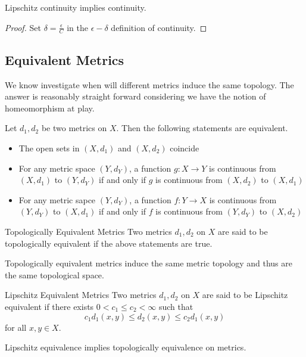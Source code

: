 \begin{lmm}{}{} Lipschitz continuity implies continuity. \tcbline
\begin{proof}
Set $\delta=\frac{\epsilon}{C}$ in the $\epsilon-\delta$ definition of continuity. 
\end{proof}
\end{lmm}

\subsection{Equivalent Metrics}
We know investigate when will different metrics induce the same topology. The answer is reasonably straight forward considering we have the notion of homeomorphism at play. 

\begin{thm}{}{} Let $d_1,d_2$ be two metrics on $X$. Then the following statements are equivalent. 
\begin{itemize}
\item The open sets in $(X,d_1)$ and $(X,d_2)$ coincide
\item For any metric space $(Y,d_Y)$, a function $g:X\to Y$ is continuous from $(X,d_1)$ to $(Y,d_Y)$ if and only if $g$ is continuous from $(X,d_2)$ to $(X,d_1)$
\item For any metric sapce $(Y,d_Y)$, a function $f:Y\to X$ is continuous from $(Y,d_Y)$ to $(X,d_1)$ if and only if $f$ is continuous from $(Y,d_Y)$ to $(X,d_2)$
\end{itemize}
\end{thm}

\begin{defn}{Topologically Equivalent Metrics}{} Two metrics $d_1,d_2$ on $X$ are said to be topologically equivalent if the above statements are true. 
\end{defn}

\begin{lmm}{}{} Topologically equivalent metrics induce the same metric topology and thus are the same topological space. 
\end{lmm}

\begin{defn}{Lipschitz Equivalent Metrics}{} Two metrics $d_1,d_2$ on $X$ are said to be Lipschitz equivalent if there exists $0<c_1\leq c_2<\infty$ such that $$c_1d_1(x,y)\leq d_2(x,y)\leq c_2d_1(x,y)$$ for all $x,y\in X$. 
\end{defn}

\begin{lmm}{}{} Lipschitz equivalence implies topologically equivalence on metrics. 
\end{lmm}

